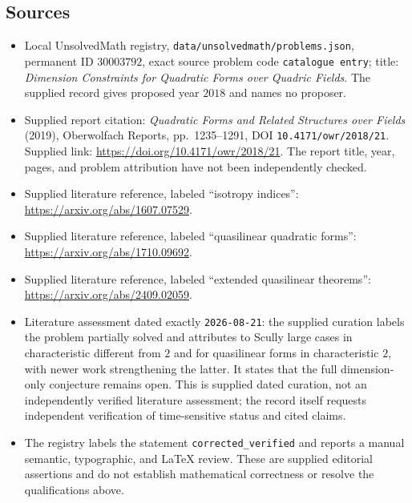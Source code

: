 \documentclass[11pt]{article}
\begin{document}
\subsection{Sources}
\begin{itemize}
\item Local UnsolvedMath registry, \texttt{data/unsolvedmath/problems.json}, permanent ID \(30003792\), exact source problem code \texttt{catalogue entry}; title: \emph{Dimension Constraints for Quadratic Forms over Quadric Fields}. The supplied record gives proposed year \(2018\) and names no proposer.
\item Supplied report citation: \emph{Quadratic Forms and Related Structures over Fields} (2019), Oberwolfach Reports, pp.~1235--1291, DOI \texttt{10.4171/owr/2018/21}. Supplied link: \url{https://doi.org/10.4171/owr/2018/21}. The report title, year, pages, and problem attribution have not been independently checked.
\item Supplied literature reference, labeled ``isotropy indices'': \url{https://arxiv.org/abs/1607.07529}.
\item Supplied literature reference, labeled ``quasilinear quadratic forms'': \url{https://arxiv.org/abs/1710.09692}.
\item Supplied literature reference, labeled ``extended quasilinear theorems'': \url{https://arxiv.org/abs/2409.02059}.
\item Literature assessment dated exactly \texttt{2026-08-21}: the supplied curation labels the problem partially solved and attributes to Scully large cases in characteristic different from \(2\) and for quasilinear forms in characteristic \(2\), with newer work strengthening the latter. It states that the full dimension-only conjecture remains open. This is supplied dated curation, not an independently verified literature assessment; the record itself requests independent verification of time-sensitive status and cited claims.
\item The registry labels the statement \texttt{corrected\_verified} and reports a manual semantic, typographic, and LaTeX review. These are supplied editorial assertions and do not establish mathematical correctness or resolve the qualifications above.
\end{itemize}
\end{document}
